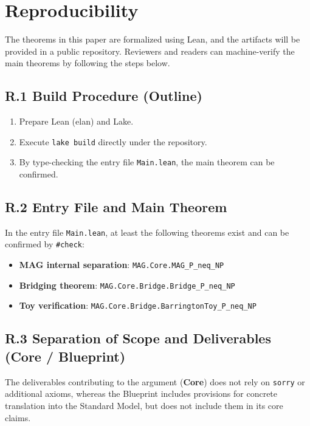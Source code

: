 \documentclass[11pt,a4paper]{article}
\theoremstyle{plain}
\theoremstyle{definition}
\newcommand{\lean}[1]{\texttt{#1}}
\begin{document}
\section*{Reproducibility}

The theorems in this paper are formalized using Lean, and the artifacts will be provided in a public repository. Reviewers and readers can machine-verify the main theorems by following the steps below.

\subsection*{R.1 Build Procedure (Outline)}

\begin{enumerate}[nosep]
\item Prepare Lean (elan) and Lake.
\item Execute \texttt{lake build} directly under the repository.
\item By type-checking the entry file \lean{Main.lean}, the main theorem can be confirmed.
\end{enumerate}

\subsection*{R.2 Entry File and Main Theorem}

In the entry file \lean{Main.lean}, at least the following theorems exist and can be confirmed by \lean{\#check}:
\begin{itemize}[nosep]
\item \textbf{MAG internal separation}: \lean{MAG.Core.MAG\_P\_neq\_NP}
\item \textbf{Bridging theorem}: \lean{MAG.Core.Bridge.Bridge\_P\_neq\_NP}
\item \textbf{Toy verification}: \lean{MAG.Core.Bridge.BarringtonToy\_P\_neq\_NP}
\end{itemize}

\subsection*{R.3 Separation of Scope and Deliverables (Core / Blueprint)}

The deliverables contributing to the argument (\textbf{Core}) does not rely on \lean{sorry} or additional axioms, whereas the Blueprint includes provisions for concrete translation into the Standard Model, but does not include them in its core claims.
\end{document}
